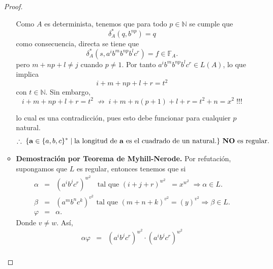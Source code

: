 \documentclass{article}
\begin{document}
\begin{enumerate}
\begin{proof}
\begin{itemize}
      Como $A$ es determinista, tenemos que para todo $p \in \mathbb{N}$ se cumple que
      \[
      \delta^{*}_{A}(q, b^{np}) = q
      \]
      como consecuencia, directa se tiene que
      \[
      \delta^{*}_{A}(s, a^{i}b^{m}b^{np}b^{l}c^{r}) = f \in \mathbb{F}_{A}.
      \]
      pero $m + np + l \neq j$ cuando $p \neq 1$. Por tanto $ a^{i}b^{m}b^{np}b^{l}c^{r} \in L(A)$,
      lo que implica
      \[
      i + m + np + l + r = t^{2}
      \]
      con $t \in \mathbb{N}$. Sin embargo,
      \[
      i + m + np + l + r = t^{2}\; \not\rightarrow\; i + m + n(p + 1) + l + r = t^{2} + n = x^{2}\; !!!
      \]
      \begin{center}
    \end{center}      
      lo cual es una contradicción, pues esto debe funcionar para cualquier $p$ natural.
      \[
      \therefore\; \{\mathbf{a} \in \{a, b, c\}^{*}\; |\; \text{la longitud de $\mathbf{a}$
        es el cuadrado de un natural.}\} \text{ \textbf{NO} es regular}.
      \]
    \item \textbf{Demostración por Teorema de Myhill-Nerode.} Por refutación, supongamos que
      $L$ es regular, entonces tenemos que si
      \begin{eqnarray*}
        \alpha &=& (a^{i}b^{j}c^{r})^{w^2}\;\; \text{ tal que } (i + j + r)^{w^2}\;\; = x^{w^2}\; \Rightarrow \alpha \in L.\\
        \beta &=& (a^{m}b^{n}c^{k})^{v^2} \text{ tal que } (m + n + k)^{v^2} = (y)^{v^2} \Rightarrow \beta \in L.\\
        \varphi &=& \alpha.
      \end{eqnarray*}
      Donde $v \neq w$. Así,
      \begin{eqnarray*}
        \alpha \varphi &=& (a^{i}b^{j}c^{r})^{w^2} \cdot (a^{i}b^{j}c^{r})^{w^2}\\

\end{eqnarray*}
\end{itemize}
\end{proof}
\end{enumerate}
\end{document}
